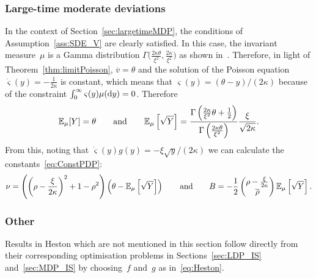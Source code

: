 \subsubsection{Large-time moderate deviations} 
In the context of Section~\ref{sec:largetimeMDP}, 
the conditions of Assumption~\ref{ass:SDE_V} are clearly satisfied. 
In this case, the invariant measure~$\mu$ is a Gamma distribution $\Gamma\big(\frac{2\kappa\theta}{\xi^2}, \frac{2\kappa}{\xi^2}\big)$ 
as shown in~\cite[Section~3.]{Cox1985ARates}.
Therefore, in light of Theorem~\ref{thm:limitPoisson}, 
$\overline{v} = \theta$ and the solution of the Poisson equation $\dot{\varsigma}(y)=-\frac{1}{2\kappa}$ is constant, which means
that
$\varsigma(y) = (\theta-y)/(2\kappa)$
because of the constraint $\int_{0}^{\infty}\varsigma(y)\mu(\mathrm{d} y)=0$.
Therefore 
$$
\mathbb{E}_\mu[Y] = \theta
\qquad\text{and}\qquad
\mathbb{E}_\mu\left[\sqrt{Y}\right]
=\frac{\Gamma\left( \frac{2\kappa}{\xi^2}\theta + \frac{1}{2} \right )}{\Gamma\left( \frac{2\kappa\theta}{\xi^2} \right )} \frac{\xi}{\sqrt{2\kappa}}.
$$
From this, noting that $\dot{\varsigma}(y)g(y) = -\xi\sqrt{y}/(2\kappa)$ we can calculate the constants~\eqref{eq:ConstPDP}:
\begin{align*}
\nu = \left( \left( \rho - \frac{\xi}{2\kappa} \right)^2 + 1-\rho^2 \right)\left( \theta - \mathbb{E}_\mu\left[\sqrt{Y}\right]\right)
\qquad \text{and} \qquad
B = -\frac{1}{2}
\begin{pmatrix}
\rho - \frac{\xi}{2\kappa}\\
\overline{\rho}\\
\end{pmatrix}\mathbb{E}_\mu\left[\sqrt{Y}\right].
\end{align*}

\subsubsection{Other}
Results in Heston which are not mentioned in this section follow directly from their corresponding optimisation problems in Sections~\ref{sec:LDP_IS} and~\ref{sec:MDP_IS} by choosing~$f$ and~$g$ as in~\eqref{eq:Heston}.

